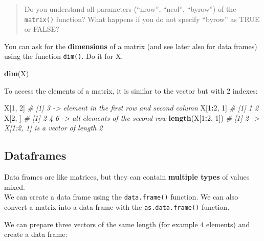 \documentclass[
]{book}
\newenvironment{Shaded}{\begin{snugshade}}{\end{snugshade}}
\newcommand{\CommentTok}[1]{\textcolor[rgb]{0.56,0.35,0.01}{\textit{#1}}}
\newcommand{\DecValTok}[1]{\textcolor[rgb]{0.00,0.00,0.81}{#1}}
\newcommand{\FunctionTok}[1]{\textcolor[rgb]{0.13,0.29,0.53}{\textbf{#1}}}
\newcommand{\NormalTok}[1]{#1}
\newcommand{\SpecialCharTok}[1]{\textcolor[rgb]{0.81,0.36,0.00}{\textbf{#1}}}
\begin{document}
\begin{quote}
Do you understand all parameters (``nrow'', ``ncol'', ``byrow'') of the \texttt{matrix()} function?
What happens if you do not specify ``byrow'' as TRUE or FALSE?
\end{quote}

You can ask for the \textbf{dimensions} of a matrix (and see later also for data frames) using the function \texttt{dim()}.
Do it for X.

\begin{Shaded}
\begin{Highlighting}[]
\FunctionTok{dim}\NormalTok{(X)}
\end{Highlighting}
\end{Shaded}

To access the elements of a matrix, it is similar to the vector but with 2 indexes:

\begin{Shaded}
\begin{Highlighting}[]
\NormalTok{X[}\DecValTok{1}\NormalTok{, }\DecValTok{2}\NormalTok{]                     }\CommentTok{\# [1] 3  {-}\textgreater{} element in the first row and second column}
\NormalTok{X[}\DecValTok{1}\SpecialCharTok{:}\DecValTok{2}\NormalTok{, }\DecValTok{1}\NormalTok{]                     }\CommentTok{\# [1] 1 2 }
\NormalTok{X[}\DecValTok{2}\NormalTok{, ]                      }\CommentTok{\# [1] 2 4 6  {-}\textgreater{} all elements of the second row}
\FunctionTok{length}\NormalTok{(X[}\DecValTok{1}\SpecialCharTok{:}\DecValTok{2}\NormalTok{, }\DecValTok{1}\NormalTok{])             }\CommentTok{\# [1] 2  {-}\textgreater{} X[1:2, 1] is a vector of length 2}
\end{Highlighting}
\end{Shaded}

\hypertarget{dataframes}{%
\subsection*{Dataframes}\label{dataframes}}

Data frames are like matrices, but they can contain \textbf{multiple types} of values mixed.\\
We can create a data frame using the \texttt{data.frame()} function.
We can also convert a matrix into a data frame with the \texttt{as.data.frame()} function.

We can prepare three vectors of the same length (for example 4 elements) and create a data frame:
\end{document}

